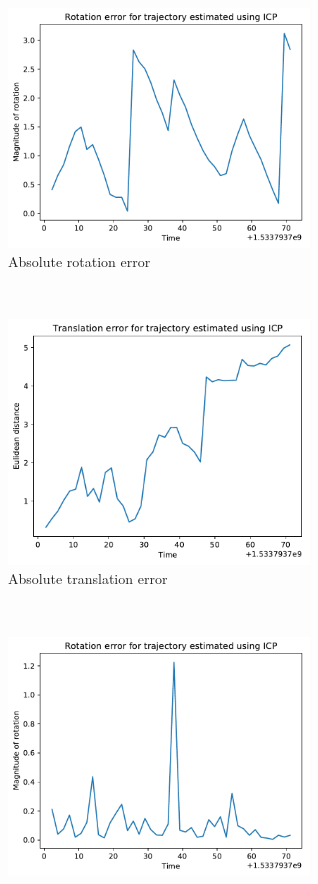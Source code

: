 \documentclass[12pt,a4paper]{article}
\begin{document}
    \begin{figure}[b!]
      \begin{subfigure}[t]{0.5\textwidth}
      \centering
        \includegraphics[width=80mm]{../quad/basic-reg-saves/50/aeR_icp.pdf}
        \caption{Absolute rotation error}
      \end{subfigure} %
      ~
      \begin{subfigure}[t]{0.5\textwidth}
        \includegraphics[width=80mm]{../quad/basic-reg-saves/50/aet_icp.pdf}
        \caption{Absolute translation error}
      \end{subfigure} \\
      \begin{subfigure}[t]{0.5\textwidth}
      \centering
        \includegraphics[width=80mm]{../quad/basic-reg-saves/50/reR_icp.pdf}

\end{subfigure}
\end{figure}
\end{document}
